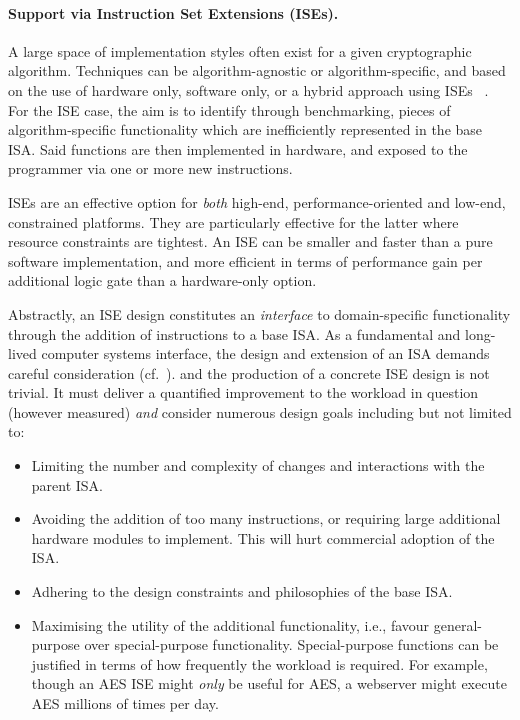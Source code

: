
\paragraph{Support via Instruction Set Extensions (ISEs).}

A large space of implementation styles often exist
for a given cryptographic algorithm.
Techniques can be
   algorithm-agnostic
   or
   algorithm-specific,
and based on the use of   
   hardware              only,
                software only,
   or
   a hybrid approach using ISEs ~\cite{GalBer:11,BarGioMar:09,RegIen:16}.
For the ISE case, the aim is to identify through benchmarking, pieces of
algorithm-specific functionality which are inefficiently represented in the
base ISA.
Said functions are then implemented in hardware, and exposed to the
programmer via one or more new instructions.

ISEs are an effective option for {\em both}
high-end, performance-oriented
and
 low-end, constrained
platforms. 
They are particularly effective for the latter where resource constraints
are tightest.
An ISE can be smaller and faster than a pure software implementation,
and more efficient in terms of performance gain per additional logic gate
than a hardware-only option.

Abstractly, an ISE design constitutes
an {\em interface} to domain-specific functionality through the
addition of instructions to a base ISA.
As a fundamental and long-lived computer systems interface, the design
and extension of an ISA demands careful consideration
(cf.~\cite[Section 4]{Gueron:09}). 
and the production of a concrete ISE design is not trivial.
It must deliver a quantified improvement to the workload in 
question (however measured) {\em and}
consider numerous design goals including but not limited to:

\begin{itemize}
\item Limiting the number and complexity of changes and interactions with the
    parent ISA.
\item Avoiding the addition of too many instructions, or requiring large
    additional hardware modules to implement. This will hurt commercial
    adoption of the ISA.
\item Adhering to the design constraints and philosophies of the base ISA.
\item Maximising the utility of the additional functionality,
      i.e.,
      favour general-purpose over special-purpose functionality.
      Special-purpose functions can be justified in terms of how frequently
      the workload is required.
      For example, though an AES ISE might {\em only}
      be useful for AES, a webserver might execute AES millions of times
      per day.
\end{itemize}

